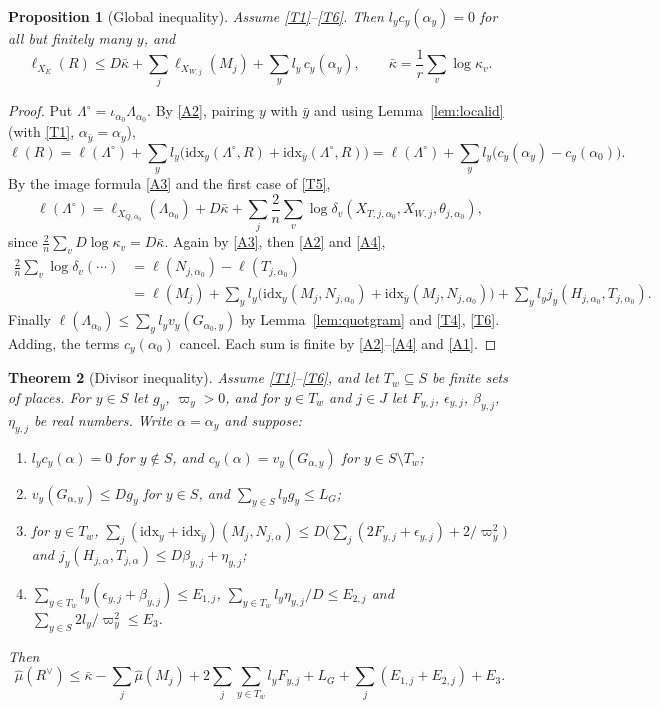 \documentclass[11pt]{amsart}
\theoremstyle{plain}
\newtheorem{theorem}{Theorem}[section]
\newtheorem{proposition}[theorem]{Proposition}
\theoremstyle{definition}
\numberwithin{equation}{section}
\begin{document}
\begin{proposition}[Global inequality]\label{prop:globaldiv}
Assume \ref{T1}--\ref{T6}. Then $l_yc_y(\alpha_y)=0$ for all but finitely many $y$, and
\[
\ell_{X_E}(R)\le D\bar\kappa+\sum_j\ell_{X_{W,j}}(M_j)+\sum_yl_y\,c_y(\alpha_y),\qquad
\bar\kappa=\frac1r\sum_v\log\kappa_v.
\]
\end{proposition}

\begin{proof}
Put $\Lambda^\circ=\iota_{\alpha_0}\Lambda_{\alpha_0}$. By \ref{A2}, pairing $y$ with $\bar y$ and using
Lemma~\ref{lem:localid} (with \ref{T1}, $\alpha_{\bar y}=\alpha_y$),
\[
\ell(R)=\ell(\Lambda^\circ)+\sum_yl_y\bigl(\mathrm{idx}_y(\Lambda^\circ,R)+\mathrm{idx}_{\bar y}(\Lambda^\circ,R)\bigr)
=\ell(\Lambda^\circ)+\sum_yl_y\bigl(c_y(\alpha_y)-c_y(\alpha_0)\bigr).
\]
By the image formula \ref{A3} and the first case of \ref{T5},
\[
\ell(\Lambda^\circ)=\ell_{X_{Q,\alpha_0}}(\Lambda_{\alpha_0})+D\bar\kappa+\sum_j\frac2n\sum_v\log\delta_v(X_{T,j,\alpha_0},X_{W,j},\theta_{j,\alpha_0}),
\]
since $\frac2n\sum_vD\log\kappa_v=D\bar\kappa$. Again by \ref{A3}, then \ref{A2} and \ref{A4},
\begin{align*}
\tfrac2n\textstyle\sum_v\log\delta_v(\cdots)&=\ell(N_{j,\alpha_0})-\ell(T_{j,\alpha_0})\\
&=\ell(M_j)+\textstyle\sum_yl_y\bigl(\mathrm{idx}_y(M_j,N_{j,\alpha_0})+\mathrm{idx}_{\bar y}(M_j,N_{j,\alpha_0})\bigr)+\sum_yl_yj_y(H_{j,\alpha_0},T_{j,\alpha_0}).
\end{align*}
Finally $\ell(\Lambda_{\alpha_0})\le\sum_yl_yv_y(G_{\alpha_0,y})$ by Lemma~\ref{lem:quotgram} and \ref{T4}, \ref{T6}. Adding,
the terms $c_y(\alpha_0)$ cancel. Each sum is finite by \ref{A2}--\ref{A4} and \ref{A1}.
\end{proof}

\begin{theorem}[Divisor inequality]\label{thm:divisor}
Assume \ref{T1}--\ref{T6}, and let $T_w\subseteq S$ be finite sets of places.
For $y\in S$ let $g_y$, $\varpi_y>0$, and for $y\in T_w$ and $j\in J$ let $F_{y,j}$, $\epsilon_{y,j}$,
$\beta_{y,j}$, $\eta_{y,j}$ be real numbers. Write $\alpha=\alpha_y$ and suppose:
\begin{enumerate}[label=\textup{(\alph*)}]
\item $l_yc_y(\alpha)=0$ for $y\notin S$, and $c_y(\alpha)=v_y(G_{\alpha,y})$ for $y\in S\setminus T_w$;
\item $v_y(G_{\alpha,y})\le Dg_y$ for $y\in S$, and $\sum_{y\in S}l_yg_y\le L_G$;
\item for $y\in T_w$, $\sum_j(\mathrm{idx}_y+\mathrm{idx}_{\bar y})(M_j,N_{j,\alpha})\le D\bigl(\sum_j(2F_{y,j}+\epsilon_{y,j})+2/\varpi_y^2\bigr)$
  and $j_y(H_{j,\alpha},T_{j,\alpha})\le D\beta_{y,j}+\eta_{y,j}$;
\item $\sum_{y\in T_w}l_y(\epsilon_{y,j}+\beta_{y,j})\le E_{1,j}$, $\sum_{y\in T_w}l_y\eta_{y,j}/D\le E_{2,j}$ and
  $\sum_{y\in S}2l_y/\varpi_y^2\le E_3$.
\end{enumerate}
Then
\[
\hat\mu(R^\vee)\le\bar\kappa-\sum_j\hat\mu(M_j)+2\sum_j\sum_{y\in T_w}l_yF_{y,j}+L_G+\sum_j(E_{1,j}+E_{2,j})+E_3.
\]
\end{theorem}
\end{document}
